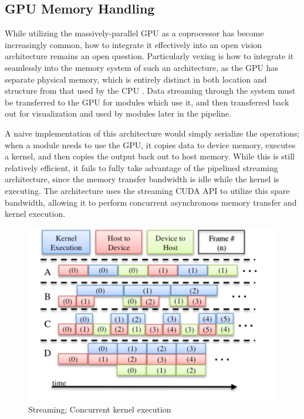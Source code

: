 \subsection{GPU Memory Handling}
While utilizing the massively-parallel GPU as a coprocessor has become increasingly common, how to integrate it effectively into an open vision architecture remains an open question. Particularly vexing is how to integrate it seamlessly into the memory system of such an architecture, as the GPU has separate physical memory, which is entirely distinct in both location and structure from that used by the CPU \cite{NVIDIA_Fermi}. Data streaming through the system must be transferred to the GPU for modules which use it, and then transferred back out for visualization and used by modules later in the pipeline.

A naive implementation of this architecture would simply serialize the operations; when a module needs to use the GPU, it copies data to device memory, executes a kernel, and then copies the output back out to host memory. While this is still relatively efficient, it fails to fully take advantage of the pipelined streaming architecture, since the memory transfer bandwidth is idle while the kernel is executing. The architecture uses the streaming CUDA API to utilize this spare bandwidth, allowing it to perform concurrent asynchronous memory transfer and kernel execution. 

\begin{figure}[t]
\begin{center}
\includegraphics[width=0.7\linewidth]{ConcurrentGPU.pdf}
\end{center}
   \caption[Streaming and Concurrent Kernels]{Streaming; Concurrent kernel execution}
\label{fig:Streaming}
\end{figure}

